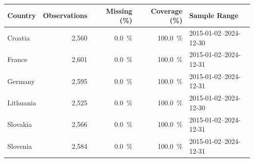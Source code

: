 \begin{tabular}{lrrrl}
\toprule
Country & Observations & Missing (\%) & Coverage (\%) & Sample Range \\
\midrule
Croatia & 2,560 & 0.0~\% & 100.0~\% & 2015-01-02--2024-12-30 \\
France & 2,601 & 0.0~\% & 100.0~\% & 2015-01-02--2024-12-31 \\
Germany & 2,595 & 0.0~\% & 100.0~\% & 2015-01-02--2024-12-31 \\
Lithuania & 2,525 & 0.0~\% & 100.0~\% & 2015-01-02--2024-12-30 \\
Slovakia & 2,566 & 0.0~\% & 100.0~\% & 2015-01-02--2024-12-31 \\
Slovenia & 2,584 & 0.0~\% & 100.0~\% & 2015-01-02--2024-12-31 \\
\bottomrule
\end{tabular}

